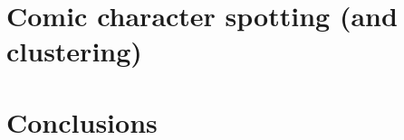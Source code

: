 \section{Comic character spotting (and clustering)}
\label{ssec:in:character}


\section{Conclusions}
\label{sec:in:conclusion}


